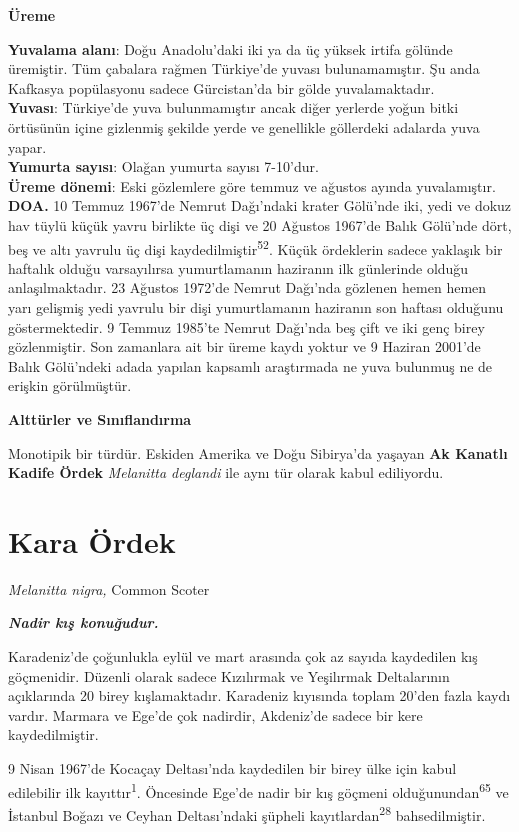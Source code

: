\documentclass[
  letterpaper,
  DIV=11,
  numbers=noendperiod]{scrreprt}
\begin{document}
\textbf{Üreme}

\textbf{Yuvalama alanı}: Doğu Anadolu'daki iki ya da üç yüksek irtifa
gölünde üremiştir. Tüm çabalara rağmen Türkiye'de yuvası bulunamamıştır.
Şu anda Kafkasya popülasyonu sadece Gürcistan'da bir gölde
yuvalamaktadır.\\
\textbf{Yuvası}: Türkiye'de yuva bulunmamıştır ancak diğer yerlerde
yoğun bitki örtüsünün içine gizlenmiş şekilde yerde ve genellikle
göllerdeki adalarda yuva yapar.\\
\textbf{Yumurta sayısı}: Olağan yumurta sayısı 7-10'dur.\\
\textbf{Üreme dönemi}: Eski gözlemlere göre temmuz ve ağustos ayında
yuvalamıştır. \textbf{DOA.} 10 Temmuz 1967'de Nemrut Dağı'ndaki krater
Gölü'nde iki, yedi ve dokuz hav tüylü küçük yavru birlikte üç dişi ve 20
Ağustos 1967'de Balık Gölü'nde dört, beş ve altı yavrulu üç dişi
kaydedilmiştir\textsuperscript{52}. Küçük ördeklerin sadece yaklaşık bir
haftalık olduğu varsayılırsa yumurtlamanın haziranın ilk günlerinde
olduğu anlaşılmaktadır. 23 Ağustos 1972'de Nemrut Dağı'nda gözlenen
hemen hemen yarı gelişmiş yedi yavrulu bir dişi yumurtlamanın haziranın
son haftası olduğunu göstermektedir. 9 Temmuz 1985'te Nemrut Dağı'nda
beş çift ve iki genç birey gözlenmiştir. Son zamanlara ait bir üreme
kaydı yoktur ve 9 Haziran 2001'de Balık Gölü'ndeki adada yapılan
kapsamlı araştırmada ne yuva bulunmuş ne de erişkin görülmüştür.

\textbf{Alttürler ve Sınıflandırma}

Monotipik bir türdür. Eskiden Amerika ve Doğu Sibirya'da yaşayan
\textbf{Ak Kanatlı Kadife Ördek} \emph{Melanitta deglandi} ile aynı tür
olarak kabul ediliyordu.

\section{Kara Ördek}\label{kara-uxf6rdek}

\emph{Melanitta nigra,} Common Scoter

\textbf{\emph{Nadir kış konuğudur.}}

Karadeniz'de çoğunlukla eylül ve mart arasında çok az sayıda kaydedilen
kış göçmenidir. Düzenli olarak sadece Kızılırmak ve Yeşilırmak
Deltalarının açıklarında 20 birey kışlamaktadır. Karadeniz kıyısında
toplam 20'den fazla kaydı vardır. Marmara ve Ege'de çok nadirdir,
Akdeniz'de sadece bir kere kaydedilmiştir.

9 Nisan 1967'de Kocaçay Deltası'nda kaydedilen bir birey ülke için kabul
edilebilir ilk kayıttır\textsuperscript{1}. Öncesinde Ege'de nadir bir
kış göçmeni olduğunundan\textsuperscript{65} ve İstanbul Boğazı ve
Ceyhan Deltası'ndaki şüpheli kayıtlardan\textsuperscript{28}
bahsedilmiştir.
\end{document}
